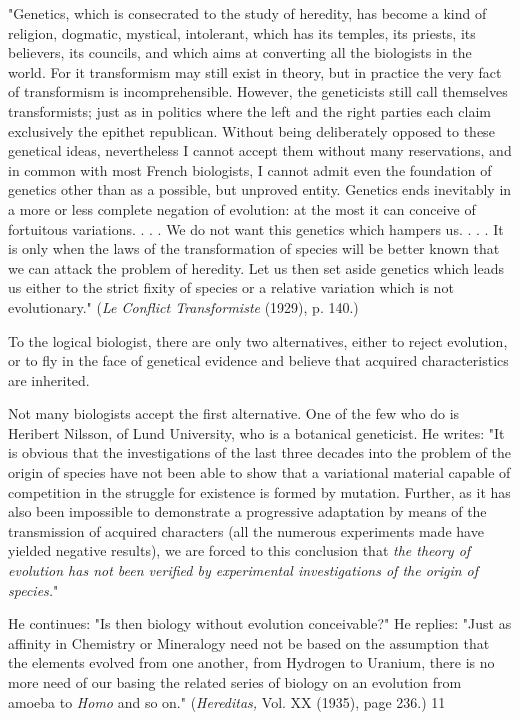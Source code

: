"Genetics, which is consecrated to the study of heredity, has become a kind of religion,
dogmatic, mystical, intolerant, which has its temples, its priests, its believers, its councils,
and which aims at converting all the biologists in the world. For it transformism may still
exist in theory, but in practice the very fact of transformism is incomprehensible. However,
the geneticists still call themselves transformists; just as in politics where the left and the
right parties each claim exclusively the epithet republican. Without being deliberately
opposed to these genetical ideas, nevertheless I cannot accept them without many
reservations, and in common with most French biologists, I cannot admit even the foundation
of genetics other than as a possible, but unproved entity. Genetics ends inevitably in a more
or less complete negation of evolution: at the most it can conceive of fortuitous variations. . .
. We do not want this genetics which hampers us. . . . It is only when the laws of the
transformation of species will be better known that we can attack the problem of heredity.
Let us then set aside genetics which leads us either to the strict fixity of species or a relative
variation which is not evolutionary." (\textit{Le Conflict Transformiste} (1929), p. 140.)

To the logical biologist, there are only two alternatives, either to reject evolution, or to fly in
the face of genetical evidence and believe that acquired characteristics are inherited.

Not many biologists accept the first alternative. One of the few who do is Heribert Nilsson,
of Lund University, who is a botanical geneticist. He writes: "It is obvious that the
investigations of the last three decades into the problem of the origin of species have not been
able to show that a variational material capable of competition in the struggle for existence is
formed by mutation. Further, as it has also been impossible to demonstrate a progressive
adaptation by means of the transmission of acquired characters (all the numerous
experiments made have yielded negative results), we are forced to this conclusion that \textit{the
theory of evolution has not been verified by experimental investigations of the origin of
species.}"

He continues: "Is then biology without evolution conceivable?" He replies: "Just as affinity
in Chemistry or Mineralogy need not be based on the assumption that the elements evolved
from one another, from Hydrogen to Uranium, there is no more need of our basing the related
series of biology on an evolution from amoeba to \textit{Homo} and so on." (\textit{Hereditas,} Vol. XX
(1935), page 236.) 11

